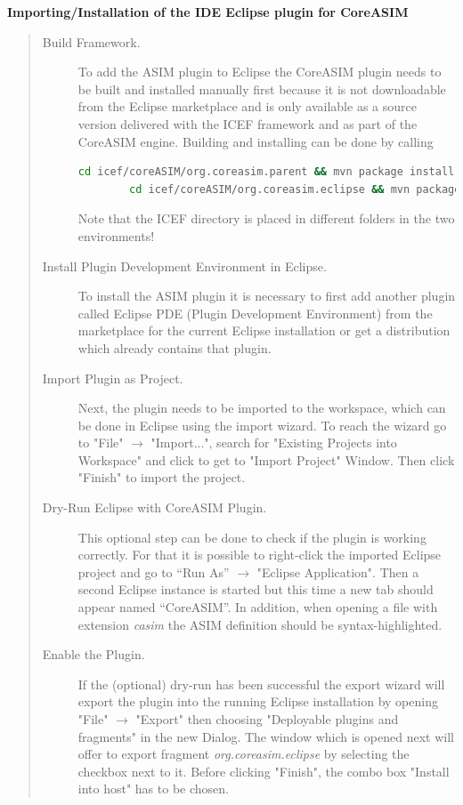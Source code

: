 \textbf{Importing/Installation of the IDE Eclipse plugin for CoreASIM}
\begin{quote}
\small
\begin{description}
	\item[Build Framework.] To add the ASIM plugin to Eclipse the CoreASIM plugin needs to be built and installed  manually first because it is not downloadable from the Eclipse marketplace and is only available as a source version delivered with the ICEF framework and as part of the CoreASIM engine. Building and installing can be done by calling
	\begin{lstlisting}[language=bash]
		cd icef/coreASIM/org.coreasim.parent && mvn package install
		cd icef/coreASIM/org.coreasim.eclipse && mvn package install\end{lstlisting}
	Note that the ICEF directory is placed in different folders in the two environments!
	
	\item[Install Plugin Development Environment in Eclipse.] To install the ASIM plugin it is necessary to first add another plugin called Eclipse PDE (Plugin Development Environment) from the marketplace for the current Eclipse installation or get a distribution which already contains that plugin.
	
	\item[Import Plugin as Project.] Next, the plugin needs to be imported to the workspace, which can be done in Eclipse using the import wizard. To reach the wizard go to "File" $\rightarrow$ "Import...", search for "Existing Projects into Workspace" and click to get to "Import Project" Window. Then click "Finish" to import the project.
	
	\item[Dry-Run Eclipse with CoreASIM Plugin.] This optional step can be done to check if the plugin is working correctly. For that it is possible to right-click the imported Eclipse project and go to ``Run As'' $\rightarrow$ "Eclipse Application". Then a second Eclipse instance is started but this time a new tab should appear named ``CoreASIM''. In addition, when opening a file with extension \textit{casim} the ASIM definition should be syntax-highlighted.

	\item[Enable the Plugin.] If the (optional) dry-run has been successful the export wizard will export the plugin into the running Eclipse installation by opening "File" $\rightarrow$  "Export" then choosing "Deployable plugins and fragments" in the new Dialog. The window which is opened next will offer to export fragment  \textit{org.coreasim.eclipse} by selecting the checkbox next to it. Before clicking "Finish", the combo box "Install into host" has to be chosen.
\end{description}
\end{quote}

